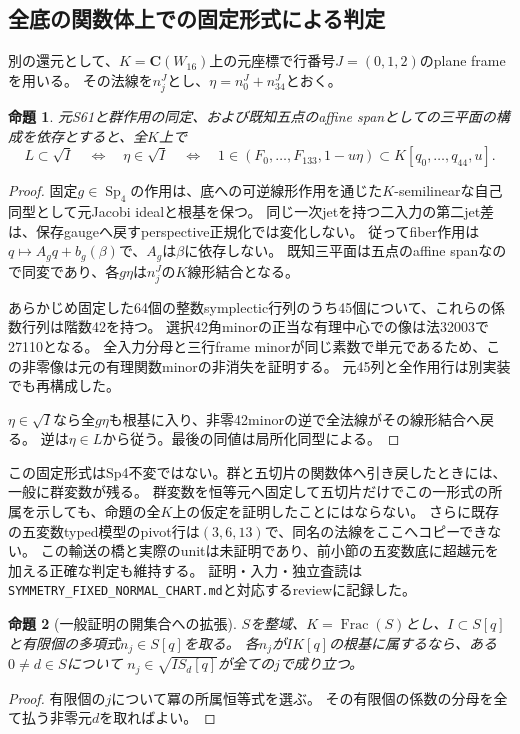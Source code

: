 \documentclass[a4paper,11pt]{ltjsarticle}
\newtheorem{proposition}{命題}[section]
\theoremstyle{definition}
\newcommand{\CC}{\mathbf C}
\newcommand{\Sp}{\operatorname{Sp}}
\begin{document}
\subsection{全底の関数体上での固定形式による判定}
別の還元として、\(K=\CC(W_{16})\)上の元座標で行番号\(J=(0,1,2)\)のplane frameを用いる。
その法線を\(n_j^J\)とし、\(\eta=n_0^J+n_{34}^J\)とおく。
\begin{proposition}\label{prop:fixed-normal}
元S61と群作用の同定、および既知五点のaffine spanとしての三平面の構成を依存とすると、全\(K\)上で
\[
 L\subset\sqrt I\quad\Longleftrightarrow\quad\eta\in\sqrt I
 \quad\Longleftrightarrow\quad
 1\in(F_0,\ldots,F_{133},1-u\eta)\subset K[q_0,\ldots,q_{44},u].
\]
\end{proposition}
\begin{proof}
固定\(g\in\Sp_4\)の作用は、底への可逆線形作用を通じた\(K\)-semilinearな自己同型として元Jacobi idealと根基を保つ。
同じ一次jetを持つ二入力の第二jet差は、保存gaugeへ戻すperspective正規化では変化しない。
従ってfiber作用は\(q\mapsto A_gq+b_g(\beta)\)で、\(A_g\)は\(\beta\)に依存しない。
既知三平面は五点のaffine spanなので同変であり、各\(g\eta\)は\(n_j^J\)の\(K\)線形結合となる。

あらかじめ固定した64個の整数symplectic行列のうち45個について、これらの係数行列は階数42を持つ。
選択42角minorの正当な有理中心での像は法32003で27110となる。
全入力分母と三行frame minorが同じ素数で単元であるため、この非零像は元の有理関数minorの非消失を証明する。
元45列と全作用行は別実装でも再構成した。

\(\eta\in\sqrt I\)なら全\(g\eta\)も根基に入り、非零42minorの逆で全法線がその線形結合へ戻る。
逆は\(\eta\in L\)から従う。最後の同値は局所化同型による。
\end{proof}

この固定形式はSp4不変ではない。群と五切片の関数体へ引き戻したときには、一般に群変数が残る。
群変数を恒等元へ固定して五切片だけでこの一形式の所属を示しても、命題の全\(K\)上の仮定を証明したことにはならない。
さらに既存の五変数typed模型のpivot行は\((3,6,13)\)で、同名の法線をここへコピーできない。
この輸送の橋と実際のunitは未証明であり、前小節の五変数底に超越元を加える正確な判定も維持する。
証明・入力・独立査読は\texttt{SYMMETRY\_FIXED\_NORMAL\_CHART.md}と対応するreviewに記録した。

\begin{proposition}[一般証明の開集合への拡張]\label{prop:spread}
\(S\)を整域、\(K=\operatorname{Frac}(S)\)とし、\(I\subset S[q]\)と有限個の多項式\(n_j\in S[q]\)を取る。
各\(n_j\)が\(I K[q]\)の根基に属するなら、ある\(0\ne d\in S\)について
\(n_j\in\sqrt{I S_d[q]}\)が全ての\(j\)で成り立つ。
\end{proposition}
\begin{proof}
有限個の\(j\)について冪の所属恒等式を選ぶ。
その有限個の係数の分母を全て払う非零元\(d\)を取ればよい。
\end{proof}
\end{document}
